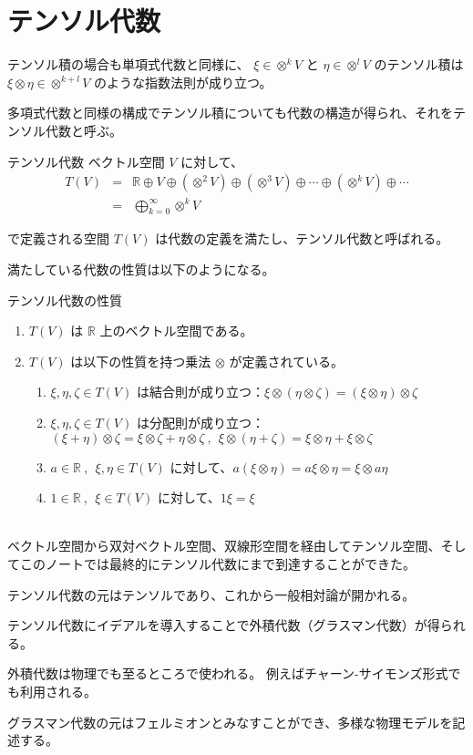 \documentclass[uplatex,a4j,12pt,dvipdfmx]{jsarticle}
\begin{document}
\section{テンソル代数}

テンソル積の場合も単項式代数と同様に、
$\xi \in \otimes^{k} V$
と
$\eta \in \otimes^{l} V$
のテンソル積は
$\xi \otimes \eta \in \otimes^{k+l} V$
のような指数法則が成り立つ。

多項式代数と同様の構成でテンソル積についても代数の構造が得られ、それをテンソル代数と呼ぶ。

\begin{itembox}[l]{テンソル代数}
	ベクトル空間 $V$ に対して、
	\[
		\begin{array}{rcl}
			T(V) & = & \mathbb{R} \oplus V \oplus ( \otimes^{2} V ) \oplus ( \otimes^{3} V ) \oplus \cdots \oplus ( \otimes^{k} V ) \oplus \cdots \\
			     & = & \displaystyle \bigoplus_{k=0}^{\infty} \otimes^{k} V
		\end{array}
	\]

	で定義される空間 $T(V)$ は代数の定義を満たし、テンソル代数と呼ばれる。
\end{itembox}

満たしている代数の性質は以下のようになる。

\begin{itembox}[l]{テンソル代数の性質}
	\begin{enumerate}
		\item $T(V)$ は $\mathbb{R}$ 上のベクトル空間である。
		\item $T(V)$ は以下の性質を持つ乗法 $\otimes$ が定義されている。
		      \begin{enumerate}
			      \item $\xi,\eta,\zeta \in T(V)$ は結合則が成り立つ：$\xi \otimes (\eta \otimes \zeta) = (\xi \otimes \eta) \otimes \zeta$
			      \item $\xi,\eta,\zeta \in T(V)$ は分配則が成り立つ：$(\xi + \eta) \otimes \zeta = \xi \otimes \zeta + \eta \otimes \zeta \ , \ \ \xi \otimes (\eta + \zeta) = \xi \otimes \eta + \xi \otimes \zeta$
			      \item $a \in \mathbb{R} \ , \ \ \xi,\eta \in T(V)$ に対して、$a (\xi \otimes \eta) = a \xi \otimes \eta = \xi \otimes a \eta$
			      \item $1 \in \mathbb{R} \ , \ \ \xi \in T(V)$ に対して、$1\xi=\xi$
		      \end{enumerate}
	\end{enumerate}
\end{itembox}

\ \\

ベクトル空間から双対ベクトル空間、双線形空間を経由してテンソル空間、そしてこのノートでは最終的にテンソル代数にまで到達することができた。

テンソル代数の元はテンソルであり、これから一般相対論が開かれる。

テンソル代数にイデアルを導入することで外積代数（グラスマン代数）が得られる。

外積代数は物理でも至るところで使われる。
例えばチャーン-サイモンズ形式でも利用される。

グラスマン代数の元はフェルミオンとみなすことができ、多様な物理モデルを記述する。
\end{document}
